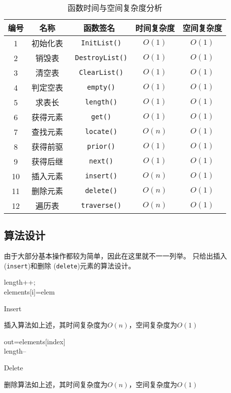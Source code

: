 \begin{table}[h]
\centering
\caption{函数时间与空间复杂度分析}
\label{tab:timeandspace1}
\begin{tabular}{@{}ccccc@{}}
\toprule
编号                          & 名称  & 函数签名 & 时间复杂度 & 空间复杂度 \\ \toprule
    \multicolumn{1}{c|}{1}  & 初始化表 & \texttt{ InitList()} & $O(1)$ &  $O(1)$ \\
    \multicolumn{1}{c|}{2}  & 销毁表& \texttt{ DestroyList()} & $O(1)$ &  $O(1)$ \\
    \multicolumn{1}{c|}{3}  & 清空表& \texttt{ ClearList()} & $O(1)$ &  $O(1)$   \\
    \multicolumn{1}{c|}{4}  & 判定空表& \texttt{ empty()} & $O(1)$ &  $O(1)$     \\
    \multicolumn{1}{c|}{5}  & 求表长 & \texttt{ length()} & $O(1)$ &  $O(1)$     \\
    \multicolumn{1}{c|}{6}  & 获得元素 & \texttt{ get()} & $O(1)$ &  $O(1)$      \\
    \multicolumn{1}{c|}{7}  & 查找元素 & \texttt{ locate()} & $O(n)$ &  $O(1)$   \\
    \multicolumn{1}{c|}{8}  & 获得前驱 & \texttt{ prior()} & $O(1)$ &  $O(1)$    \\
    \multicolumn{1}{c|}{9}  & 获得后继 & \texttt{ next()} & $O(1)$ &  $O(1)$     \\
    \multicolumn{1}{c|}{10}  & 插入元素 & \texttt{ insert()} & $O(n)$ &  $O(1)$  \\
    \multicolumn{1}{c|}{11}  & 删除元素 & \texttt{ delete()} & $O(n)$ &  $O(1)$  \\
    \multicolumn{1}{c|}{12}  & 遍历表 & \texttt{ traverse()}   & $O(n)$ & $O(1)$ \\ \bottomrule
\end{tabular}
\end{table}
\subsection{算法设计}
由于大部分基本操作都较为简单，因此在这里就不一一列举。
只给出插入 (\texttt{insert})和删除 (\texttt{delete})元素的算法设计。
\newline
\begin{algorithm}[H]
    \SetAlgoLined
    length++;
    \\
    elements[i]=elem
\caption{Insert}\label{alg:insert}
\end{algorithm}
插入算法如上述，其时间复杂度为$O(n)$，空间复杂度为$O(1)$
\begin{algorithm}
    \SetAlgoLined
    out=elements[index]
    \\
    length--
\caption{Delete}\label{alg:delete}
\end{algorithm}
\newline
删除算法如上述，其时间复杂度为$O(n)$，空间复杂度为$O(1)$
